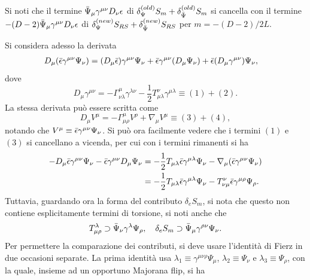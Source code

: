 \begin{obs}
    Si noti che il termine $\bar{\Psi}_\mu\gamma^{\mu\nu}D_\nu\epsilon$ di $\delta_\Psi^{(old)}S_m + \delta_{\bar{\Psi}}^{(old)}S_m$ si cancella con il termine $-(D - 2)\bar{\Psi}_\mu\gamma^{\mu\nu}D_\nu\epsilon$ di $\delta_{\Psi}^{(new)}S_{RS} + \delta_{\bar{\Psi}}^{(new)}S_{RS}$ per $m = -(D - 2)/2L$. 
\end{obs}
Si considera adesso la derivata
\begin{equation}
    \begin{split}
        D_\mu(\bar{\epsilon}\gamma^{\mu\nu}\Psi_\nu) &= (D_\mu\bar{\epsilon})\gamma^{\mu\nu}\Psi_\nu + \bar{\epsilon}\gamma^{\mu\nu}(D_\mu\Psi_\nu) + \bar{\epsilon}(D_\mu\gamma^{\mu\nu})\Psi_\nu,
    \end{split}
\end{equation}
dove
\begin{equation}
    D_\mu\gamma^{\mu\nu} = -\Gamma^\mu_{\nu\lambda}\gamma^{\lambda\nu} - \frac{1}{2}T^\nu_{\mu\lambda}\gamma^{\mu\lambda} \equiv (1) + (2).
\end{equation}
La stessa derivata può essere scritta come
\begin{equation}
    D_\mu V^\mu = -\Gamma_{\mu\rho}^\mu V^\rho + \nabla_\mu V^\mu \equiv (3) + (4),
\end{equation}
notando che $V^\mu \equiv \bar{\epsilon}\gamma^{\mu\nu}\Psi_\nu$. Si può ora facilmente vedere che i termini $(1)$ e $(3)$ si cancellano a vicenda, per cui con i termini rimanenti si ha
\begin{equation}
    \begin{split}
        -D_\mu\bar{\epsilon}\gamma^{\mu\nu}\Psi_\nu - \bar{\epsilon}\gamma^{\mu\nu}D_\mu\Psi_\nu &= -\frac{1}{2}T_{\mu\lambda}\bar{\epsilon}\gamma^{\mu\lambda}\Psi_\nu - \nabla_\mu(\bar{\epsilon}\gamma^{\mu\nu}\Psi_\nu) \\
        &= -\frac{1}{2}T_{\mu\lambda}\bar{\epsilon}\gamma^{\mu\lambda}\Psi_\nu - T^\nu_{\nu\mu}\bar{\epsilon}\gamma^{\mu\rho}\Psi_\rho.
    \end{split}
\end{equation}
Tuttavia, guardando ora la forma del contributo $\delta_eS_m$, si nota che questo non contiene esplicitamente termini di torsione, si noti anche che 
\begin{equation}
    T_{\mu\rho}^\lambda \supset \bar{\Psi}_\nu\gamma^{\lambda}\Psi_\rho,\quad \delta_eS_m \supset \bar{\Psi}_\mu\gamma^{\rho\nu}\Psi_\nu.
\end{equation}
Per permettere la comparazione dei contributi, si deve usare l'identità di Fierz in due occasioni separate. La prima identità usa $\lambda_1 \equiv \gamma^{\mu\nu\rho}\Psi_\mu$, $\lambda_2 \equiv \Psi_\nu$ e $\lambda_3 \equiv \Psi_\rho$, con la quale, insieme ad un opportuno Majorana flip, si ha 
